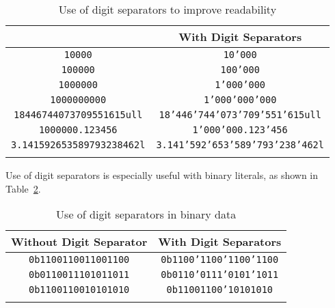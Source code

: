 \begin{table}[h!]
\begin{center}
\begin{threeparttable}
\caption{Use of digit separators to improve readability}\label{digitseparator-table1}\vspace{1.5ex}
{\small \begin{tabular}{c|c}\thickhline
\rowcolor[gray]{.9}{\sffamily\bfseries Without Digit Separator} & {\sffamily\bfseries With Digit Separators} \\ \hline
\texttt{10000} & \texttt{10'000} \\ \hline
\texttt{100000} & \texttt{100'000} \\ \hline
\texttt{1000000} & \texttt{1'000'000} \\ \hline
\texttt{1000000000} & \texttt{1'000'000'000} \\ \hline
\texttt{18446744073709551615ull} & \texttt{18'446'744'073'709'551'615ull} \\ \hline
\texttt{1000000.123456} & \texttt{1'000'000.123'456} \\ \hline
\texttt{3.141592653589793238462l} & \texttt{3.141'592'653'589'793'238'462l} \\ \thickhline
\end{tabular}
} %
\end{threeparttable}
\end{center}
\end{table}
\noindent Use of digit separators is especially useful with binary
literals, as shown in Table~\ref{digitseparator-table2}.\begin{table}[h!]
\begin{center}
\begin{threeparttable}
\caption{Use of digit separators in binary data}\label{digitseparator-table2}\vspace{1.5ex}
{\small \begin{tabular}{c|c}
\thickhline
\rowcolor[gray]{.9} {\sffamily\bfseries Without Digit Separator} & {\sffamily\bfseries With Digit Separators} \\\hline
\texttt{0b1100110011001100} & \texttt{0b1100'1100'1100'1100} \\ \hline
\texttt{0b0110011101011011} & \texttt{0b0110'0111'0101'1011} \\ \hline
\texttt{0b1100110010101010} & \texttt{0b11001100'10101010} \\
\thickhline
\end{tabular}
} %
\end{threeparttable}
\end{center}
\end{table}

